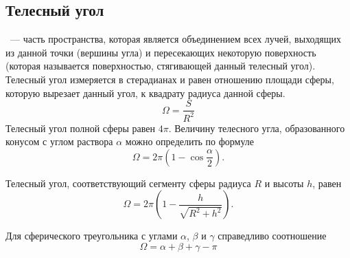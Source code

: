 \subsection{Телесный угол}
~--- часть пространства, которая является объединением всех лучей, выходящих из данной точки (вершины угла) и пересекающих некоторую поверхность (которая называется поверхностью, стягивающей данный телесный угол). Телесный угол измеряется в стерадианах и равен отношению площади сферы, которую вырезает данный угол, к квадрату радиуса данной сферы.
\begin{equation}
	\Omega = \frac{S}{R^2}
\end{equation}
Телесный угол полной сферы равен $4\pi$. Величину телесного угла, образованного конусом с углом раствора $\alpha$ можно определить по формуле
\begin{equation}
	\Omega = 2 \pi \left(1 - \cos \frac{\alpha}{2}\right).
\end{equation}

Телесный угол, соответствующий сегменту сферы радиуса $R$ и высоты $h$, равен
\begin{equation}
	\Omega = 2 \pi \left(1 - \dfrac{h}{\sqrt{R^2 + h^2}}\right).
\end{equation}

Для сферического треугольника с углами $\alpha$, $\beta$ и $\gamma$ справедливо соотношение
\begin{equation}
	\Omega = \alpha + \beta + \gamma - \pi
\end{equation}
